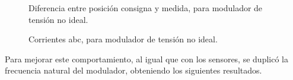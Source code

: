 \documentclass[a4paper, 10pt, onecolumn,journal]{ieeeconf}
\begin{document}
\begin{figure}[H]
	\centering
	\begin{adjustbox}{scale=0.52,max width=\columnwidth}
	\end{adjustbox}
	\caption{Diferencia entre posición consigna y medida, para modulador de tensión no ideal.}
	\label{Diferencia entre posición consigna y medida, para modulador de tensión no ideal}
\end{figure}

\begin{figure}[H]
	\centering
	\begin{adjustbox}{scale=0.52,max width=\columnwidth}
	\end{adjustbox}
	\caption{Corrientes abc, para modulador de tensión no ideal.}
	\label{Corrientes abc, para modulador de tensión no ideal}
\end{figure}
Para mejorar este comportamiento, al igual que con los sensores, se duplicó la frecuencia natural del modulador, obteniendo los siguientes resultados.
\end{document}
